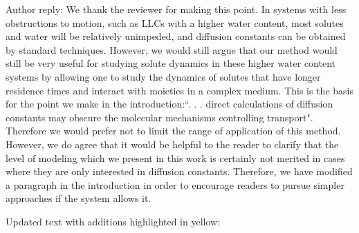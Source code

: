 \documentclass{article}
\begin{document}
\begin{enumerate}[label={Comment \theenumi :}, leftmargin=3.9\parindent]
    Author reply: We thank the reviewer for making this point. 
    In systems with less obstructions to motion, such as LLCs with a higher water content, most 
    solutes and water will be relatively unimpeded, and diffusion constants can be obtained by 
    standard techniques.    
    However, we would still argue that our method would still be very useful for studying
    solute dynamics in these higher water content systems 
    by allowing one to study the dynamics of solutes that have longer residence times and interact
    with moieties in a complex medium. %
    This is the basis for the point we make in the introduction:``. . . direct calculations of diffusion 
    constants may obscure the molecular mechanisms controlling transport". Therefore we would
    prefer not to limit the range of application of this method. 
    However, we do agree that it would be helpful to the reader to clarify that the level of modeling 
    which we present in this work is certainly not merited in cases where they are only interested in
    diffusion constants. Therefore, we have modified a paragraph in the introduction in order to
    encourage readers to pursue simpler approaches if the system allows it.
    
    Updated text with additions highlighted in yellow:
    

\end{enumerate}
\end{document}
